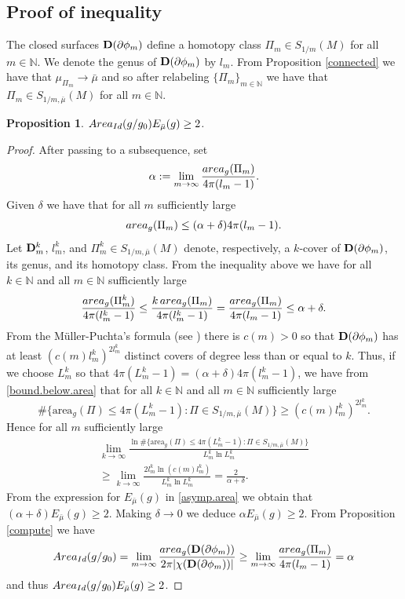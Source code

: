 \documentclass[11pt]{amsart}
\def\N{\mathbb N}
\newtheorem{prop}[thm]{Proposition}
\theoremstyle{remark}
\theoremstyle{definition}
\begin{document}
{{	
	\subsection{Proof of inequality} The closed surfaces  ${\bf D}(\partial\phi_m)$ define a homotopy class $\Pi_m\in S_{1/m}(M)$ for all $m\in\N.$  We denote the genus of ${\bf D}(\partial\phi_m)$ by $l_m$. {From Proposition \ref{connected} we have that $\mu_{\Pi_m}\to\bar\mu$ and so after relabeling $\{\Pi_m
	\}_{m\in\N}$ we have that $\Pi_m\in S_{1/m,\bar\mu}(M)$ for all $m\in\N$}.
	
	\begin{prop}${\rm Area}_{{\rm Id}}(g/g_0) {E_{\bar\mu}(g)}\geq 2$.
	\end{prop}
	\begin{proof}
		After passing to a subsequence, set
		$$\alpha:=\lim_{m\to\infty}\frac{{\rm area}_g(\Pi_m)}{4\pi(l_m-1)}.$$
		Given $\delta$ we have that for all $m$ sufficiently large
		$${\rm area}_g(\Pi_m)\leq (\alpha+\delta)4\pi(l_m-1).$$
		Let ${\bf D}_m^k$, $l_m^k$, and $\Pi_m^k\in {S_{1/m,\bar\mu}(M)}$ denote, respectively, a $k$-cover of  ${\bf D}(\partial\phi_m)$,  its genus, and  its homotopy class.
		From the inequality above we have for all $k\in\N$ and all $m\in\N$ sufficiently large
		\begin{equation}\label{bound.below.area}
			\frac{{\rm area}_g(\Pi_m^k)}{4\pi(l_m^k-1)}\leq \frac{k\,{\rm area}_g(\Pi_m)}{4\pi(l_m^k-1)}=\frac{{\rm area}_g(\Pi_m)}{4\pi(l_m-1)}\leq \alpha+\delta.
		\end{equation}
		From the   M\"uller-Puchta's formula (see \cite[Section 4]{cal-marques-neves}) there is $c(m)>0$ so that  ${\bf D}(\partial\phi_m)$ has at least $(c(m)l_m^k)^{2l_m^k}$ distinct covers of degree less than or equal to $k$.  Thus, if we choose $L_m^k$ so that $4\pi(L_m^k-1)= (\alpha+\delta)4\pi(l^k_m-1)$, we have from \eqref{bound.below.area} that for all $k\in \N$ and all $m\in\N$ sufficiently large
		$$\#\{\text{area}_g(\Pi)\leq 4\pi(L_m^k-1):\Pi\in {S_{1/m,\bar\mu}(M)}\}\geq (c(m)l_m^k)^{2l_m^k}.$$
		Hence for all $m$ sufficiently large
		\begin{multline*}
			\lim_{k\to\infty}\frac{\ln \#\{\text{area}_g(\Pi)\leq 4\pi(L_m^k-1):\Pi\in{S_{1/m,\bar\mu}(M)}\}}{L_m^k\ln L_m^k}\\
			\geq \lim_{k\to\infty}\frac{2l_m^k\ln(c(m)l_m^k)}{L_m^k\ln L_m^k}=\frac{2}{\alpha+\delta}.
		\end{multline*}
		From  the expression for ${E_{\bar\mu}(g)}$ in \eqref{asymp.area} we obtain that
		$(\alpha+\delta)E_{\bar\mu}(g)\geq 2$. Making $\delta\to 0$ we deduce $\alpha {E_{\bar\mu}(g)}\geq 2$. From Proposition \ref{compute} we have
		$$ {\rm Area}_{{\rm Id}}(g/g_0)=\lim_{m\to\infty}\frac{{\rm area}_g({\bf D}(\partial\phi_m))}{2\pi|\chi({\bf D}(\partial\phi_m))|}\geq \lim_{m\to\infty}\frac{{\rm area}_g(\Pi_m)}{4\pi(l_m-1)}=\alpha$$
		and thus ${\rm Area}_{{\rm Id}}(g/g_0) {E_{\bar\mu}(g)}\geq 2$.
	\end{proof}
	
}}
\end{document}
